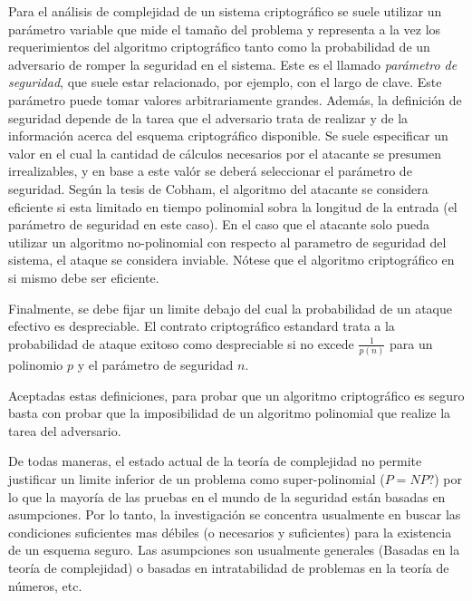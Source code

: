 Para el análisis de complejidad de un sistema criptográfico se suele utilizar un parámetro variable que mide el tamaño del problema y representa a la vez los requerimientos del algoritmo criptográfico tanto como la probabilidad de un adversario de romper la seguridad en el sistema. Este es el llamado \textit{parámetro de seguridad}, que suele estar relacionado, por ejemplo, con el largo de clave.
Este parámetro puede tomar valores arbitrariamente grandes.
Además, la definición de seguridad depende de la tarea que el adversario trata de realizar y de la información acerca del esquema criptográfico disponible.
Se suele especificar un valor en el cual la cantidad de cálculos necesarios por el atacante se presumen irrealizables, y en base a este valór se deberá seleccionar el parámetro de seguridad.
Según la tesis de Cobham\cite{citeulike:6647003}, el algoritmo del atacante se considera eficiente si esta limitado en tiempo polinomial sobra la longitud de la entrada (el parámetro de seguridad en este caso). En el caso que el atacante solo pueda utilizar un algoritmo no-polinomial con respecto al parametro de seguridad del sistema, el ataque se considera inviable. Nótese que el algoritmo criptográfico en si mismo debe ser eficiente.

Finalmente, se debe fijar un limite debajo del cual la probabilidad de un ataque efectivo es despreciable. El contrato criptográfico estandard trata a la probabilidad de ataque exitoso como despreciable si no excede $\frac{1}{p(n)}$  para un polinomio $p$ y el parámetro de seguridad $n$\cite{primes}.

Aceptadas estas definiciones, para probar que un algoritmo criptográfico es seguro basta con probar que la imposibilidad de un algoritmo polinomial que realize la tarea del adversario.

De todas maneras, el estado actual de la teoría de complejidad no permite justificar un limite inferior de un problema como super-polinomial ($P=NP?$) por lo que la mayoría de las pruebas en el mundo de la seguridad están basadas en asumpciones.
Por lo tanto, la investigación se concentra usualmente en buscar las condiciones suficientes mas débiles (o necesarios y suficientes) para la existencia de un esquema seguro.
Las asumpciones son usualmente generales (Basadas en la teoría de complejidad) o basadas en intratabilidad de problemas en la teoría de números, etc.


